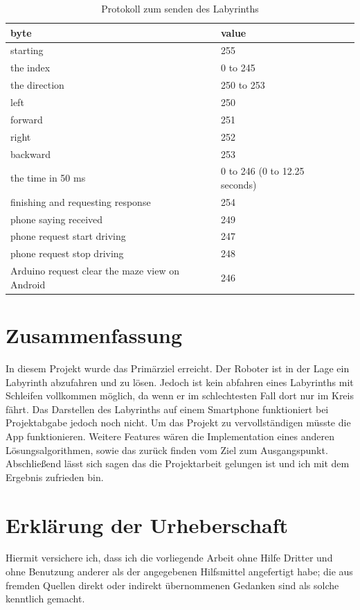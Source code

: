 \documentclass[12pt]{article}
\begin{document}
\begin{table}[h]
\caption{Protokoll zum senden des Labyrinths \label{tab:table_label}}
\begin{tabularx}{\columnwidth}{XXl}
  
  byte&value\\
  \hline
starting & 255\\
the index & 0 to 245\\
the direction & 250 to 253\\
left & 250\\
forward & 251\\
right & 252\\
backward & 253\\
the time  in 50 ms & 0 to 246 (0  to 12.25 seconds)\\
finishing and requesting response & 254\\
phone saying received & 249\\
phone request start driving & 247\\
phone request stop driving & 248\\
Arduino request clear the maze view on Android & 246\\
  
\end{tabularx}
\end{table}

\newpage
\section{Zusammenfassung} In diesem Projekt wurde das Primärziel erreicht. Der Roboter ist in der Lage ein Labyrinth abzufahren und zu lösen. Jedoch ist kein abfahren eines Labyrinths mit Schleifen vollkommen möglich, da wenn er im schlechtesten Fall dort nur im Kreis fährt. Das Darstellen des Labyrinths auf einem Smartphone funktioniert bei Projektabgabe jedoch noch nicht. Um das Projekt zu vervollständigen müsste die App funktionieren. Weitere Features wären die Implementation eines anderen Lösungsalgorithmen, sowie das zurück finden vom Ziel zum Ausgangspunkt. Abschließend lässt sich sagen das die Projektarbeit gelungen ist und ich mit dem Ergebnis zufrieden bin.  

\section{Erklärung der Urheberschaft}

Hiermit versichere ich, dass ich die vorliegende Arbeit
ohne Hilfe Dritter und ohne Benutzung anderer als der angegebenen
Hilfsmittel angefertigt habe; die aus fremden Quellen direkt oder
indirekt übernommenen Gedanken sind als solche kenntlich gemacht.
\end{document}
